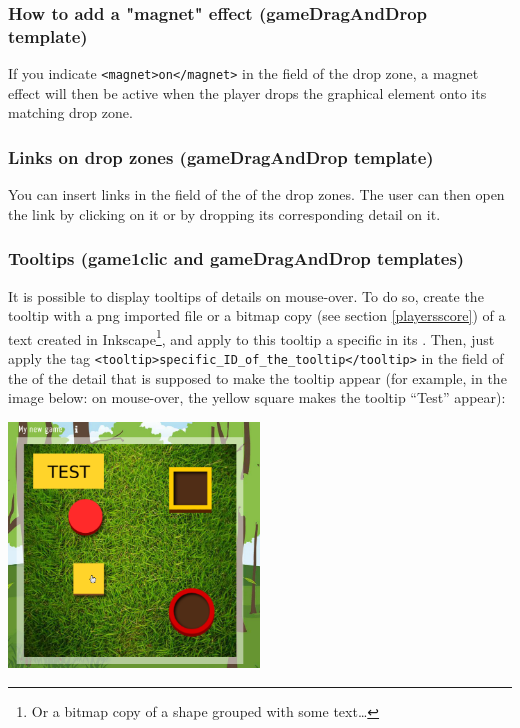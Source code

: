 \subsubsection{How to add a "magnet" effect (gameDragAndDrop template)}

If you indicate \verb|<magnet>on</magnet>| in the  field of the drop zone, a magnet effect will then be active when the player drops the 
graphical element onto its matching drop zone.

\subsubsection{Links on drop zones (gameDragAndDrop template)}
 
You can insert links in the  field of the  
of the drop zones. The user can then open the link by clicking on it or by dropping its 
corresponding detail on it.


\subsubsection{Tooltips (game1clic and gameDragAndDrop templates)}

It is possible to display tooltips of details on mouse-over. To do so, 
create the tooltip with a png imported file or a bitmap copy (see section \ref{playersscore})
of a text created in 
Inkscape\footnote{Or a bitmap copy of a shape grouped with some text\ldots}, and 
apply to this tooltip a specific  in its . Then, 
just apply the tag \verb|<tooltip>specific_ID_of_the_tooltip</tooltip>| in the 
 field of the  of the detail that is supposed 
to make the tooltip appear (for example, in the image below: on mouse-over, the
yellow square makes the tooltip ``Test'' appear):\\


\begin{center}
 \includegraphics[width=0.5\textwidth]{images/tooltip_example}\\
 \end{center}


